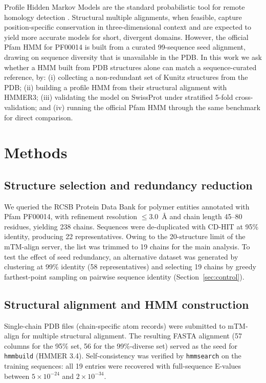 \documentclass[11pt,a4paper]{article}
\begin{document}
Profile Hidden Markov Models are the standard probabilistic tool for remote homology detection \citep{eddy2011}. Structural multiple alignments, when feasible, capture position-specific conservation in three-dimensional context and are expected to yield more accurate models for short, divergent domains. However, the official Pfam HMM for PF00014 is built from a curated 99-sequence seed alignment, drawing on sequence diversity that is unavailable in the PDB. In this work we ask whether a HMM built from PDB structures alone can match a sequence-curated reference, by: (i) collecting a non-redundant set of Kunitz structures from the PDB; (ii) building a profile HMM from their structural alignment with HMMER3; (iii) validating the model on SwissProt under stratified 5-fold cross-validation; and (iv) running the official Pfam HMM through the same benchmark for direct comparison.

\section{Methods}

\subsection{Structure selection and redundancy reduction}
We queried the RCSB Protein Data Bank \citep{burley2023rcsb} for polymer entities annotated with Pfam PF00014, with refinement resolution $\leq 3.0$~\AA{} and chain length 45--80 residues, yielding 238 chains. Sequences were de-duplicated with CD-HIT \citep{li2006cdhit} at 95\% identity, producing 22 representatives. Owing to the 20-structure limit of the mTM-align server, the list was trimmed to 19 chains for the main analysis. To test the effect of seed redundancy, an alternative dataset was generated by clustering at 99\% identity (58 representatives) and selecting 19 chains by greedy farthest-point sampling on pairwise sequence identity (Section~\ref{sec:control}).

\subsection{Structural alignment and HMM construction}
Single-chain PDB files (chain-specific atom records) were submitted to mTM-align \citep{dong2018mtmalign} for multiple structural alignment. The resulting FASTA alignment (57 columns for the 95\% set, 56 for the 99\%-diverse set) served as the seed for \texttt{hmmbuild} (HMMER 3.4). Self-consistency was verified by \texttt{hmmsearch} on the training sequences: all 19 entries were recovered with full-sequence E-values between $5 \times 10^{-24}$ and $2 \times 10^{-34}$.
\end{document}
